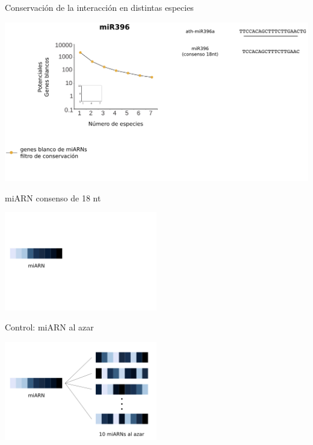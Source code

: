 \documentclass{beamer}
\begin{document}
\begin{frame}{Conservación de la interacción en distintas especies}
	\begin{center}
		\includegraphics[width=1\textwidth]{img/NAR_fig2_01.png}
	\end{center}
\end{frame}


\begin{frame}{miARN consenso de 18 nt}
	\begin{center}
		\includegraphics[width=0.5\textwidth]{img/shuffle_01.png}
	\end{center}
\end{frame}

\begin{frame}{Control: miARN al azar}
	\begin{center}
		\includegraphics[width=0.5\textwidth]{img/shuffle_02.png}
	\end{center}
\end{frame}
\end{document}
